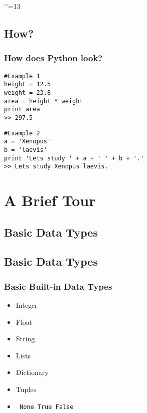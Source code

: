 \documentclass{beamer}
\begin{document}
\makeatletter
\let \@sverbatim \@verbatim
\def \@verbatim {\@sverbatim \verbatimplus}
{\catcode`'=13 \gdef \verbatimplus{\catcode`'=13 \chardef '=13 }} 
\makeatother



\subsection{How?}
\begin{frame}[fragile]
  \frametitle{How does Python look?}

  \small

\begin{verbatim}
#Example 1
height = 12.5
weight = 23.8
area = height * weight
print area
>> 297.5
\end{verbatim}

\begin{verbatim}
#Example 2
a = 'Xenopus'
b = 'laevis'
print 'Lets study ' + a + ' ' + b + '.'
>> Lets study Xenopus laevis.
\end{verbatim}


\end{frame}



\section{A Brief Tour}
\subsection{Basic Data Types}

\subsection{Basic Data Types}
\begin{frame}[fragile]
  \frametitle{Basic Built-in Data Types}
  \begin{itemize}

    \item<1-> Integer
    \item<2-> Float
    \item<3-> String
  \end{itemize}

  \begin{itemize}
    \item<4-> Lists
    \item<5-> Dictionary
  \end{itemize}

  \begin{itemize}
    \item<6-> Tuples
    \item<7-> \begin{verbatim} None True False \end{verbatim}
  \end{itemize}

\end{frame}
\end{document}

